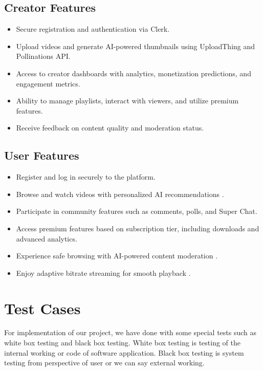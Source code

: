 \subsection{Creator Features}
\begin{itemize}[leftmargin=2cm]
  \item Secure registration and authentication via Clerk.
  \item Upload videos and generate AI-powered thumbnails using UploadThing and Pollinations API.
  \item Access to creator dashboards with analytics, monetization predictions, and engagement metrics.
  \item Ability to manage playlists, interact with viewers, and utilize premium features.
  \item Receive feedback on content quality and moderation status.
\end{itemize}

\subsection{User Features}
\begin{itemize}[leftmargin=2cm]
  \item Register and log in securely to the platform.
  \item Browse and watch videos with personalized AI recommendations \cite{covington2016deep, he2017neural}.
  \item Participate in community features such as comments, polls, and Super Chat.
  \item Access premium features based on subscription tier, including downloads and advanced analytics.
  \item Experience safe browsing with AI-powered content moderation \cite{risch2020toxic}.
  \item Enjoy adaptive bitrate streaming for smooth playback \cite{flowplayer2023abr, choi2023qoe}.
\end{itemize}

\section{Test Cases}

For implementation of our project, we have done with some special tests such as white box testing and black box testing. White box testing is testing of the internal working or code of software application. Black box testing is system testing from perspective of user or we can say external working.


